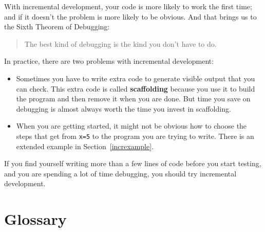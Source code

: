 
With incremental development, your code is more likely to work the first time; and if it doesn't the problem is more likely to be obvious.  And that brings us to the Sixth Theorem of Debugging:

\begin{quote}
The best kind of debugging is the kind you don't have to do.
\end{quote}

In practice, there are two problems with incremental development:

\begin{itemize}

\item Sometimes you have to write extra code to
generate visible output that you can check.  This extra code is
called {\bf scaffolding} because you use it to build the program
and then remove it when you are done.  But time you save on
debugging is almost always worth the time you invest in
scaffolding.


\item When you are getting started, it might not be obvious how to
choose the steps that get from {\tt x=5} to the program you are trying
to write.  There is an extended example in Section~\ref{increxample}.

\end{itemize}

If you find yourself writing more than a few lines of code before
you start testing, and you are spending a lot of time debugging,
you should try incremental development.


\section{Glossary}

